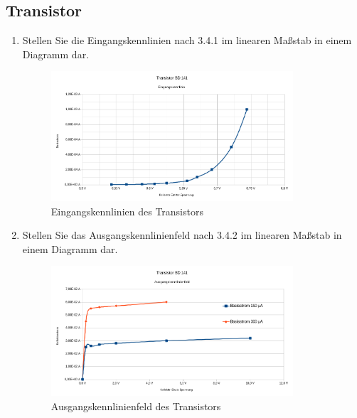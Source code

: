 \subsection{Transistor}
\begin{enumerate}[label=\alph*)]
	\item Stellen Sie die Eingangskennlinien nach 3.4.1 im linearen Maßstab in einem Diagramm dar.
	      \begin{figure}[h!]
		      \begin{center}
			      \includegraphics[width=0.85\textwidth]{img/4.3.a.1}
		      \end{center}
		      \caption{Eingangskennlinien des Transistors}
	      \end{figure}

	\item Stellen Sie das Ausgangskennlinienfeld nach 3.4.2 im linearen Maßstab in einem Diagramm dar.
	      \begin{figure}[h!]
		      \begin{center}
			      \includegraphics[width=0.85\textwidth]{img/4.3.b.1}
		      \end{center}
		      \caption{Ausgangskennlinienfeld des Transistors}
	      \end{figure}


\end{enumerate}
